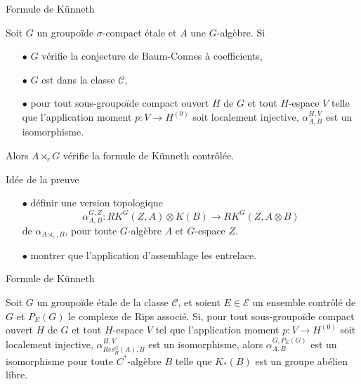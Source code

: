 \begin{frame}{Formule de Künneth}
\begin{thmfr}
Soit $G$ un groupoïde $\sigma$-compact étale et $A$ une $G$-algèbre. Si 
\begin{itemize}
\item[$\bullet$] $G$ vérifie la conjecture de Baum-Connes à coefficients,
\item[$\bullet$] $G$ est dans la classe $\mathcal C$,
\item[$\bullet$] pour tout sous-groupoïde compact ouvert $H$ de $G$ et tout $H$-espace $V$ telle que l'application moment $p : V\rightarrow H^{(0)}$ soit localement injective, $\alpha_{A,B}^{H,V}$ est un isomorphisme.
\end{itemize} 
Alors $A\rtimes_r G$ vérifie la formule de Künneth contrôlée.
\end{thmfr}
\end{frame}

\begin{frame}{Idée de la preuve}
\begin{itemize}
\item[$\bullet$] définir une version topologique 
\[\alpha_{A,B}^{G,Z} : RK^G(Z,A)\otimes K(B) \rightarrow RK^G(Z,A\otimes B)\]
de $\alpha_{A\rtimes_r,B}$, pour toute $G$-algèbre $A$ et $G$-espace $Z$.
\item[$\bullet$] montrer que l'application d'assemblage les entrelace.

\end{itemize}
\end{frame}

\begin{frame}{Formule de Künneth}
\begin{thmfr}
Soit $G$ un groupoïde étale de la classe $\mathcal C$, et soient $E\in\mathcal E$ un ensemble contrôlé de $G$ et $P_E(G)$ le complexe de Rips associé. Si, pour tout sous-groupoïde compact ouvert $H$ de $G$ et tout $H$-espace $V$ tel que l'application moment $p : V\rightarrow H^{(0)}$ soit localement injective, $\alpha_{Res_H^G(A),B}^{H,V}$ est un isomorphisme, alors $\alpha_{A,B}^{G,P_E(G)}$ est un isomorphisme pour toute $C^*$-algèbre $B$ telle que $K_*(B)$ est un groupe abélien libre.\\
\end{thmfr}
\end{frame}

